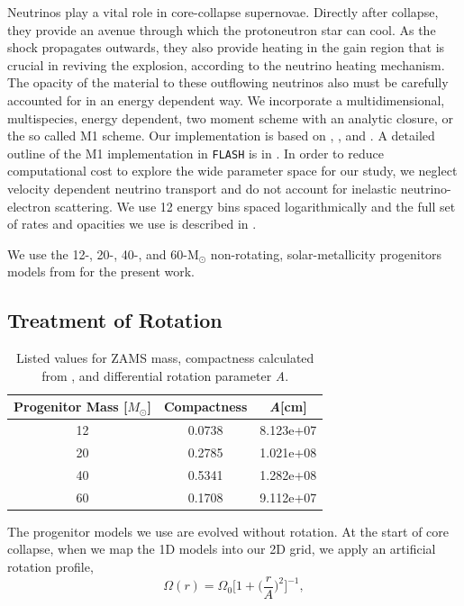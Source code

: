 \documentclass[twocolumn,times]{aastex62}  %
\newcommand{\Msun}{\ensuremath{\mathrm{M}_\odot}\xspace}
\begin{document}
Neutrinos play a vital role in core-collapse supernovae.  Directly after collapse, they provide an avenue through which the protoneutron star can cool.  As the shock propagates outwards, they also provide heating in the gain region that is crucial in reviving the explosion, according to the neutrino heating mechanism.  The opacity of the material to these outflowing neutrinos also must be carefully accounted for in an energy dependent way.  We incorporate a multidimensional, multispecies, energy dependent, two moment scheme with an analytic closure, or the so called M1 scheme.  Our implementation is based on \citet{oconnor:2015}, \citet{shibata:2011}, and \citet{cardall:2013}.  A detailed outline of the M1 implementation in \texttt{FLASH} is in \citet{oconnor:2018}.  In order to reduce computational cost to explore the wide parameter space for our study, we neglect velocity dependent neutrino transport and do not account for inelastic neutrino-electron scattering.
We use 12 energy bins spaced logarithmically and the full set of rates and opacities we use is described in \citet{oconnor:2017a}. 

We use the 12-, 20-, 40-, and 60-\Msun non-rotating, solar-metallicity progenitors models from \citet{Suk:2016} for the present work.

\subsection{Treatment of Rotation}


\begin{table}[t]
\begin{tabular}{c|c|c}
Progenitor Mass [$M_\odot$] & Compactness & \textit{A}[cm] \\
\hline
12  & 0.0738 &         8.123e+07             \\
20  & 0.2785 &         1.021e+08            \\
40  & 0.5341 &         1.282e+08           \\
60  & 0.1708 &         9.112e+07          
\end{tabular}
\caption{Listed values for ZAMS mass, compactness calculated from \citet{Suk:2016}, and differential rotation parameter \textit{A}.}
\label{table:compact}
\end{table}

The progenitor models we use are evolved without rotation.
At the start of core collapse, when we map the 1D models into our 2D grid, we apply an artificial rotation profile,
\begin{equation}
    \Omega(r) = \Omega_0 \bigg[1 + \bigg(\frac{r}{A}\bigg)^2 \bigg]^{-1}, 
    \label{eq:omega}
\end{equation}
\end{document}
